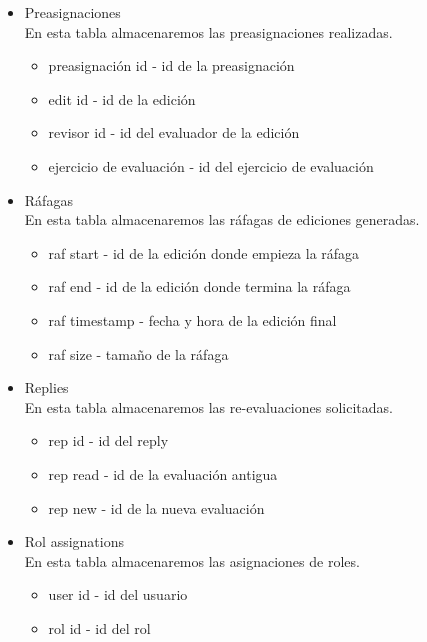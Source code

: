 \begin{itemize}
	\item Preasignaciones\\
	
	En esta tabla almacenaremos las preasignaciones realizadas.
	
	\begin{itemize}
		\item preasignación id - id de la preasignación
		\item edit id - id de la edición
		\item revisor id - id del evaluador de la edición
		\item ejercicio de evaluación - id del ejercicio de evaluación
	\end{itemize}
	
	\item Ráfagas\\
	
	En esta tabla almacenaremos las ráfagas de ediciones generadas.
	
	\begin{itemize}
		\item raf start - id de la edición donde empieza la ráfaga
		\item raf end - id de la edición donde termina la ráfaga
		\item raf timestamp - fecha y hora de la edición final
		\item raf size - tamaño de la ráfaga
	\end{itemize}
	
	\item Replies\\
	
	En esta tabla almacenaremos las re-evaluaciones solicitadas.
	
	\begin{itemize}
		\item rep id - id del reply
		\item rep read - id de la evaluación antigua
		\item rep new - id de la nueva evaluación
	\end{itemize}
	
	\item Rol assignations\\
	
	En esta tabla almacenaremos las asignaciones de roles.
	
	\begin{itemize}
		\item user id - id del usuario
		\item rol id - id del rol
	\end{itemize}
	

\end{itemize}
